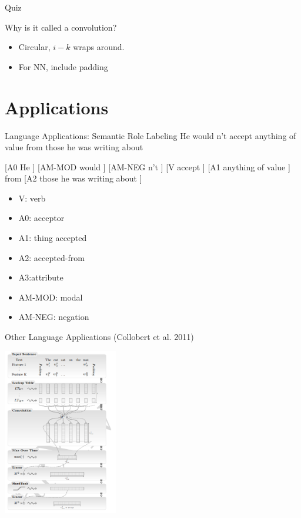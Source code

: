 \documentclass{beamer}
\begin{document}
\begin{frame}{Quiz}
\begin{itemize}
\begin{frame}{Why is it called a convolution?}
  \begin{itemize}
  \item Circular, $i-k$ wraps around. 
    \air 
  \item For NN, include padding
  \end{itemize}

  
\end{frame}


\section{Applications}


\begin{frame}{Language Applications: Semantic Role Labeling }
 He  would  n't accept anything of value from those he was writing about  

 \air 

 [A0 He ] [AM-MOD would ] [AM-NEG n't ] [V accept ] [A1 anything of value ] from [A2 those he was writing about ] 

\begin{itemize}
  \item V: verb 
   \item A0: acceptor 
   \item A1: thing accepted 
   \item A2: accepted-from 
   \item A3:attribute 
   \item AM-MOD: modal 
     \item  AM-NEG: negation
\end{itemize}
\end{frame}

\begin{frame}{Other Language Applications (Collobert et al. 2011) }
  \begin{center}
    \includegraphics[width=5cm]{cwconv}
  \end{center}
\end{frame}


\end{itemize}
\end{frame}
\end{document}
